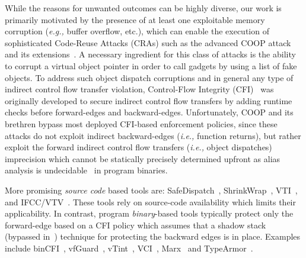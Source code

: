 While the reasons for unwanted outcomes can be highly diverse, our work is primarily motivated by the presence of at least one exploitable
memory corruption (\textit{e.g.,} buffer overflow, etc.), which can enable the execution of sophisticated Code-Reuse Attacks (CRAs) such as the advanced COOP attack~\cite{schuster:coop} and its 
extensions~\cite{crane:readactor++, subversive-c:lettner, ctf:coop, loop:oriented}. A necessary ingredient for this class of attacks is the ability
to corrupt a virtual object pointer in order to call gadgets by using a list of fake objects.
To address such object dispatch corruptions
and in general any type of indirect control flow transfer violation, Control-Flow Integrity (CFI)~\cite{abadi:cfi2, abadi:cfi} was originally developed to secure indirect control flow transfers by adding 
runtime checks before forward-edges and backward-edges. Unfortunately, COOP and its brethren bypass most deployed CFI-based enforcement policies, since 
these attacks do not exploit indirect backward-edges (\textit{i.e.,} function returns), but rather exploit the forward indirect control flow transfers (\textit{i.e.,} object dispatches)
imprecision which cannot be statically precisely determined upfront as alias analysis is undecidable~\cite{alias:undecidable} in program binaries.

More promising \textit{source code} based tools are: SafeDispatch~\cite{safedispatch:jang}, 
ShrinkWrap~\cite{haller:shrinkwrap}, VTI~\cite{bounov:interleaving}, and IFCC/VTV~\cite{vtv:tice}.
These tools rely on source-code availability which limits their applicability.
In contrast, program \textit{binary}-based tools typically protect only the forward-edge based on a CFI 
policy which assumes that a shadow stack~\cite{volodymyr:cpi} (bypassed in~\cite{safestack:bypassing}) 
technique for protecting the backward edges is in place.
Examples include binCFI~\cite{ccfir:zhang, zhang:usenix}, vfGuard~\cite{vfuard:aravind}, 
vTint~\cite{vtint:zhang}, VCI~\cite{vci:asiaccs}, Marx~\cite{marx} and TypeArmor~\cite{veen:typearmor}. 


